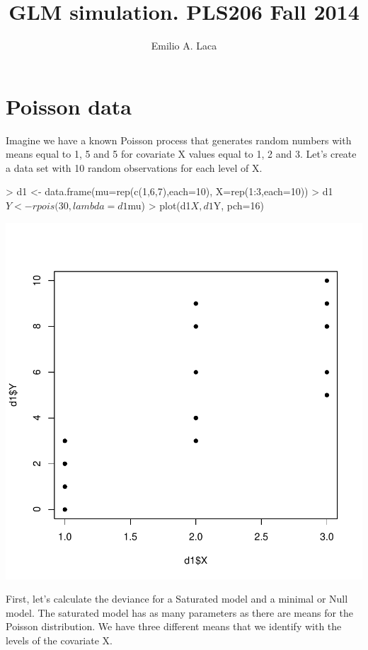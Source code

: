 \documentclass{article}
\begin{document}


\title{GLM simulation. PLS206 Fall 2014}
\author{Emilio A. Laca}
\maketitle

\section{Poisson data}
Imagine we have a known Poisson process that generates random numbers with means equal to 1, 5 and 5 for covariate X values equal to 1, 2 and 3. Let's create a data set with 10 random observations for each level of X.

\begin{Schunk}
\begin{Sinput}
> d1 <- data.frame(mu=rep(c(1,6,7),each=10), X=rep(1:3,each=10))
> d1$Y <- rpois(30,lambda = d1$mu)
> plot(d1$X, d1$Y, pch=16)
\end{Sinput}
\end{Schunk}
\includegraphics{GLMsimIntro-simData1}

First, let's calculate the deviance for a Saturated model and a minimal or Null model. The saturated model has as many parameters as there are means for the Poisson distribution. We have three different means that we identify with the levels of the covariate X.
\end{document}
